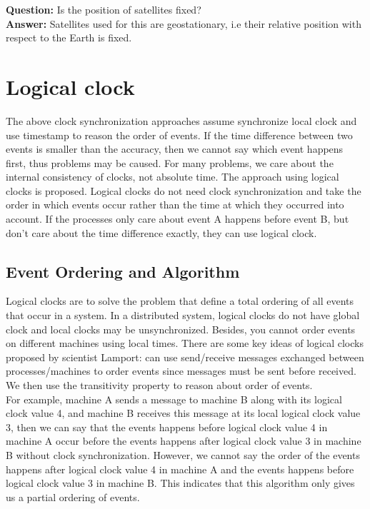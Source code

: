 \documentclass[twoside]{article}
\begin{document}
\textbf{Question:} Is the position of satellites fixed?\\
\textbf{Answer:} Satellites used for this are geostationary, i.e their relative position with respect to the Earth is fixed.


\section{Logical clock}
The above clock synchronization approaches assume synchronize local clock and use timestamp to reason the order of events. If the time difference between two events is smaller than the accuracy, then we cannot say which event happens first, thus problems may be caused. For many problems, we care about the internal consistency of clocks, not absolute time. The approach using logical clocks is proposed. Logical clocks do not need clock synchronization and take the order in which events occur rather than the time at which they occurred into account. If the processes only care about event A happens before event B, but don’t care about the time difference exactly, they can use logical clock.

\subsection{Event Ordering and Algorithm}
Logical clocks are to solve the problem that define a total ordering of all events that occur in a system. In a distributed system, logical clocks do not have global clock and local clocks may be unsynchronized. Besides, you cannot order events on different machines using local times. There are some key ideas of logical clocks proposed by scientist Lamport: can use send/receive messages exchanged between processes/machines to order events since messages must be sent before received. We then use the transitivity property to reason about order of events.\\ 

For example, machine A sends a message to machine B along with its logical clock value 4, and machine B receives this message at its local logical clock value 3, then we can say that the events happens before logical clock value 4 in machine A occur before the events happens after logical clock value 3 in machine B without clock synchronization. However, we cannot say the order of the events happens after logical clock value 4 in machine A and the events happens before logical clock value 3 in machine B. This indicates that this algorithm only gives us a partial ordering of events.\\
\end{document}
